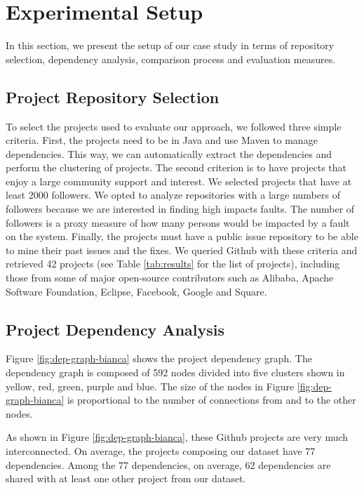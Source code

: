 \documentclass[12pt]{report}
\begin{document}
\section{Experimental Setup}\label{experimental-setup-2}

In this section, we present the setup of our case study in terms of
repository selection, dependency analysis, comparison process and
evaluation measures.

\subsection{Project Repository Selection}\label{sec:rep}

To select the projects used to evaluate our approach, we followed three
simple criteria. First, the projects need to be in Java and use Maven to
manage dependencies. This way, we can automatically extract the
dependencies and perform the clustering of projects. The second
criterion is to have projects that enjoy a large community support and
interest. We selected projects that have at least 2000 followers. We
opted to analyze repositories with a large numbers of followers because
we are interested in finding high impacts faults. The number of
followers is a proxy measure of how many persons would be impacted by a
fault on the system. Finally, the projects must have a public issue
repository to be able to mine their past issues and the fixes. We
queried Github with these criteria and retrieved 42 projects (see Table
\ref{tab:results} for the list of projects), including those from some
of major open-source contributors such as Alibaba, Apache Software
Foundation, Eclipse, Facebook, Google and Square.

\subsection{Project Dependency Analysis}\label{sec:dependencies}

Figure \ref{fig:dep-graph-bianca} shows the project dependency graph.
The dependency graph is composed of 592 nodes divided into five clusters
shown in yellow, red, green, purple and blue. The size of the nodes in
Figure \ref{fig:dep-graph-bianca} is proportional to the number of
connections from and to the other nodes.



As shown in Figure \ref{fig:dep-graph-bianca}, these Github projects are
very much interconnected. On average, the projects composing our dataset
have 77 dependencies. Among the 77 dependencies, on average, 62
dependencies are shared with at least one other project from our
dataset.
\end{document}
